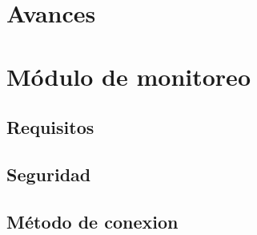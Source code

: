 \section{Avances}


\section{Módulo de monitoreo}

\subsection*{Requisitos}

\subsection*{Seguridad}

\subsection*{Método de conexion}

